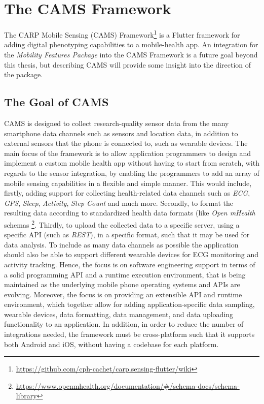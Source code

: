\section{The CAMS Framework}
The CARP Mobile Sensing (CAMS) Framework\footnote{\url{https://github.com/cph-cachet/carp.sensing-flutter/wiki}} is a Flutter framework for adding digital phenotyping capabilities to a mobile-health app. An integration for the \textit{Mobility Features Package} into the CAMS Framework is a future goal beyond this thesis, but describing CAMS will provide some insight into the direction of the package. 

\subsection{The Goal of CAMS}
CAMS is designed to collect research-quality sensor data from the many smartphone data channels such as sensors and location data, in addition to external sensors that the phone is connected to, such as wearable devices. The main focus of the framework is to allow application programmers to design and implement a custom mobile health app without having to start from scratch, with regards to the sensor integration, by enabling the programmers to add an array of mobile sensing capabilities in a flexible and simple manner. This would include, firstly, adding support for collecting health-related data channels such as \textit{ECG}, \textit{GPS}, \textit{Sleep}, \textit{Activity}, \textit{Step Count} and much more. Secondly, to format the resulting data according to standardized health data formats (like \textit{Open mHealth} schemas \footnote{\url{https://www.openmhealth.org/documentation/#/schema-docs/schema-library}}. Thirdly, to upload the collected data to a specific server, using a specific API (such as \textit{REST}), in a specific format, such that it may be used for data analysis. To include as many data channels as possible the application should also be able to support different wearable devices for ECG monitoring and activity tracking. Hence, the focus is on software engineering support in terms of a solid programming API and a runtime execution environment, that is being maintained as the underlying mobile phone operating systems and APIs are evolving. Moreover, the focus is on providing an extensible API and runtime environment, which together allow for adding application-specific data sampling, wearable devices, data formatting, data management, and data uploading functionality to an application. In addition, in order to reduce the number of integrations needed, the framework must be cross-platform such that it supports both Android and iOS, without having a codebase for each platform.

